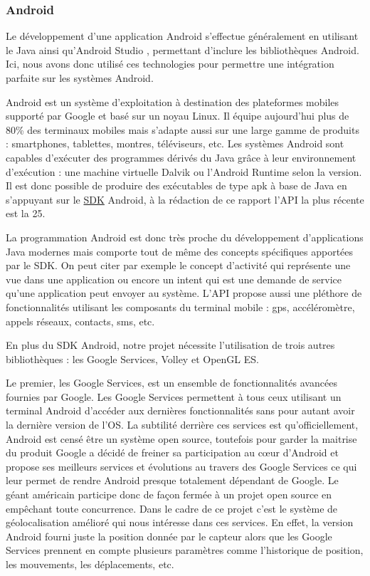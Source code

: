 \subsubsection{Android}

Le développement d'une application Android s'effectue généralement en utilisant le Java ainsi qu'Android Studio \cite{androidstudio}, permettant d'inclure les bibliothèques Android. Ici, nous avons donc utilisé ces technologies pour permettre une intégration parfaite sur les systèmes Android.

Android est un système d’exploitation à destination des plateformes mobiles supporté par Google et basé sur un noyau Linux. Il équipe aujourd’hui plus de 80\% des terminaux mobiles mais s’adapte aussi sur une large gamme de produits : smartphones, tablettes, montres, téléviseurs, etc. Les systèmes Android sont capables d’exécuter des programmes dérivés du Java grâce à leur environnement d’exécution : une machine virtuelle Dalvik ou l’Android Runtime selon la version. Il est donc possible de produire des exécutables de type apk à base de Java en s’appuyant sur le \underline{SDK} Android, à la rédaction de ce rapport l’API la plus récente est la 25.

La programmation Android est donc très proche du développement d’applications Java modernes mais comporte tout de même des concepts spécifiques apportées par le SDK. On peut citer par exemple le concept d’activité qui représente une vue dans une application ou encore un intent qui est une demande de service qu’une application peut envoyer au système. L’API propose aussi une pléthore de fonctionnalités utilisant les composants du terminal mobile : gps, accéléromètre, appels réseaux, contacts, sms, etc.

En plus du SDK Android, notre projet nécessite l’utilisation de trois autres bibliothèques : les Google Services, Volley et OpenGL ES. 

Le premier, les Google Services, est un ensemble de fonctionnalités avancées fournies par Google. Les Google Services permettent à tous ceux utilisant un terminal Android d’accéder aux dernières fonctionnalités sans pour autant avoir la dernière version de l’OS. La subtilité derrière ces services est qu’officiellement, Android est censé être un système open source, toutefois pour garder la maitrise du produit Google a décidé de freiner sa participation au cœur d’Android et propose ses meilleurs services et évolutions au travers des Google Services ce qui leur permet de rendre Android presque totalement dépendant de Google. Le géant américain participe donc de façon fermée à un projet open source en empêchant toute concurrence. Dans le cadre de ce projet c’est le système de géolocalisation amélioré qui nous intéresse dans ces services. En effet, la version Android fourni juste la position donnée par le capteur alors que les Google Services prennent en compte plusieurs paramètres comme l’historique de position, les mouvements, les déplacements, etc.

